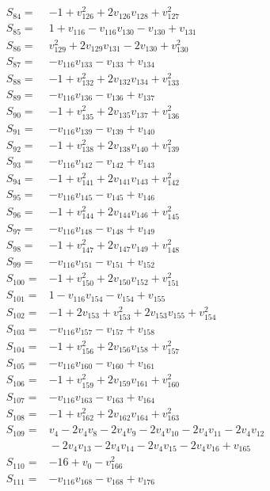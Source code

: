 \begin{align*}
S_{84}={}&-1+v_{126}^{2}+2v_{126}v_{128}+v_{127}^{2}\\
S_{85}={}&1+v_{116}-v_{116}v_{130}-v_{130}+v_{131}\\
S_{86}={}&v_{129}^{2}+2v_{129}v_{131}-2v_{130}+v_{130}^{2}\\
S_{87}={}&-v_{116}v_{133}-v_{133}+v_{134}\\
S_{88}={}&-1+v_{132}^{2}+2v_{132}v_{134}+v_{133}^{2}\\
S_{89}={}&-v_{116}v_{136}-v_{136}+v_{137}\\
S_{90}={}&-1+v_{135}^{2}+2v_{135}v_{137}+v_{136}^{2}\\
S_{91}={}&-v_{116}v_{139}-v_{139}+v_{140}\\
S_{92}={}&-1+v_{138}^{2}+2v_{138}v_{140}+v_{139}^{2}\\
S_{93}={}&-v_{116}v_{142}-v_{142}+v_{143}\\
S_{94}={}&-1+v_{141}^{2}+2v_{141}v_{143}+v_{142}^{2}\\
S_{95}={}&-v_{116}v_{145}-v_{145}+v_{146}\\
S_{96}={}&-1+v_{144}^{2}+2v_{144}v_{146}+v_{145}^{2}\\
S_{97}={}&-v_{116}v_{148}-v_{148}+v_{149}\\
S_{98}={}&-1+v_{147}^{2}+2v_{147}v_{149}+v_{148}^{2}\\
S_{99}={}&-v_{116}v_{151}-v_{151}+v_{152}\\
S_{100}={}&-1+v_{150}^{2}+2v_{150}v_{152}+v_{151}^{2}\\
S_{101}={}&1-v_{116}v_{154}-v_{154}+v_{155}\\
S_{102}={}&-1+2v_{153}+v_{153}^{2}+2v_{153}v_{155}+v_{154}^{2}\\
S_{103}={}&-v_{116}v_{157}-v_{157}+v_{158}\\
S_{104}={}&-1+v_{156}^{2}+2v_{156}v_{158}+v_{157}^{2}\\
S_{105}={}&-v_{116}v_{160}-v_{160}+v_{161}\\
S_{106}={}&-1+v_{159}^{2}+2v_{159}v_{161}+v_{160}^{2}\\
S_{107}={}&-v_{116}v_{163}-v_{163}+v_{164}\\
S_{108}={}&-1+v_{162}^{2}+2v_{162}v_{164}+v_{163}^{2}\\
S_{109}={}&v_{4}-2v_{4}v_{8}-2v_{4}v_{9}-2v_{4}v_{10}-2v_{4}v_{11}-2v_{4}v_{12}\\
&{}-2v_{4}v_{13}-2v_{4}v_{14}-2v_{4}v_{15}-2v_{4}v_{16}+v_{165}\\
S_{110}={}&-16+v_{0}-v_{166}^{2}\\
S_{111}={}&-v_{116}v_{168}-v_{168}+v_{176}\\

\end{align*}
